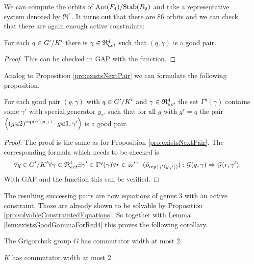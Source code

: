 \documentclass[a4paper,11pt]{amsart}
\begin{document}
We can compute the orbits of ${\textup{Aut}(F_4)/\textup{Stab}(R_2)}$ and take a representative system denoted by $\mathfrak{R}^4$.
It turns out that there are $86$ orbits and we can check that there are again enough active constraints:
\begin{lem} \label{lem:existsGoodGammaForRed4}
 For each $q\in{G'/K'}$ there is $\gamma\in \mathfrak{R}^4_{act}$ such that $(q,\gamma)$ is a 
 good pair.
\end{lem}
\begin{proof}
 This can be checked in GAP with the function\newline {}.
\end{proof}

Analog to Proposition \ref{pro:existsNextPair} we can formulate the following proposition.
\begin{pro}\label{pro:existsNextPair4}
 For each good pair $(q,\gamma)$ with $q\in{G'/K'}$ and $\gamma\in\mathfrak{R}^4_{act}$ the set $\Gamma^q(\gamma)$ 
 contains some $\gamma'$ with special generator $y_{\gamma'}$ such that for all $g$ with $g^\tau=q$ the
 pair $\left((g\at{2})^{\textup{rep}(\gamma'(y_{\gamma'})}\cdot g\at{1},\gamma'\right)$ is a good pair.
\end{pro}
\begin{proof}
The proof is the same as for Proposition \ref{pro:existsNextPair}. The corresponding formula which needs to be checked is 
\[\forall q\in{G'/K'}
      \forall \gamma\in\mathfrak{R}^4_{act} 
	 \exists \gamma'\in \Gamma^q(\gamma)
	    \forall r\in \varpi'^{-1}(\bar p_{\textup{rep}(\gamma'(y_{\gamma'}))}):
	      \mathcal{G}(q,\gamma) \Rightarrow \mathcal{G}(r,\gamma').\]
 With GAP and the function  this can be verified. 
\end{proof}
The resulting successing pairs are now equations of genus $3$ with an active constraint. Those are already shown to be solvable 
by Proposition \ref{pro:solvableConstraintedEquations}. So together with Lemma \ref{lem:existsGoodGammaForRed4} this proves the following corollary.
\begin{cor}\label{cor:GhasCW2}
 The Grigorchuk group $G$ has commutator width at most $2$.
\end{cor}
\begin{cor}\label{cor:KhasCW2}
 $K$ has commutator width at most $2$. 
\end{cor}
\end{document}
